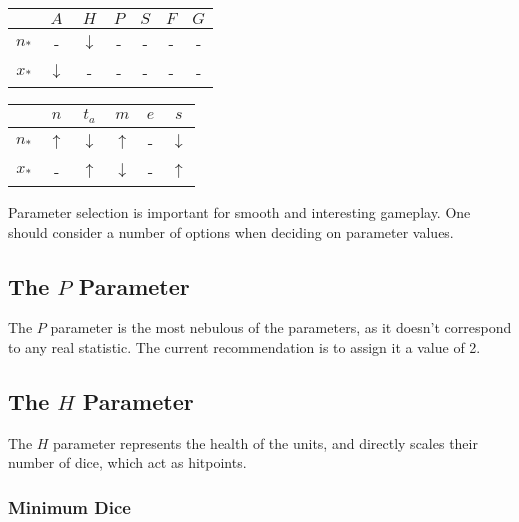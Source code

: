 \documentclass[twocolumn]{article}
\begin{document}
\begin{table}
\begin{tabular}{c|c|c|c|c|c|c}
            &   $A$             &   $H$             &   $P$ &   $S$ &   $F$ &   $G$ \\
    \hline
    $n_*$   &   -               &   $\downarrow$    &   -   &   -   &   -   &   -   \\
    $x_*$   &   $\downarrow$    &   -               &   -   &   -   &   -   &   -   
\end{tabular}
\end{table}

\begin{table}
\begin{tabular}{c|c|c|c|c|c}
            &   $n$             &   $t_a$           &   $m$             &   $e$             &   $s$             \\
    \hline
    $n_*$   &   $\uparrow$      &   $\downarrow$    &   $\uparrow$      &   -               &   $\downarrow$    \\
    $x_*$   &   -               &   $\uparrow$      &   $\downarrow$    &   -               &   $\uparrow$      \\
\end{tabular}
\end{table}

Parameter selection is important for smooth and interesting gameplay.
One should consider a number of options when deciding on parameter values.

\subsection{The $P$ Parameter}

The $P$ parameter is the most nebulous of the parameters,
as it doesn't correspond to any real statistic.
The current recommendation is to assign it a value of 2.

\subsection{The $H$ Parameter}

The $H$ parameter represents the health of the units,
and directly scales their number of dice, which act as hitpoints.

\subsubsection{Minimum Dice}
\end{document}
